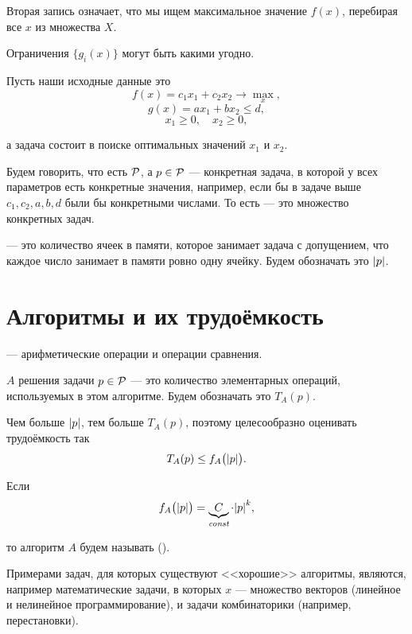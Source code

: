 Вторая запись означает, что мы ищем максимальное значение $f(x)$, перебирая все $x$ из множества $X$.

\remark

Ограничения $\{g_i(x)\}$ могут быть какими угодно.

\example

Пусть наши исходные данные это
\[f(x) = c_1 x_1 + c_2 x_2 \to \max_x,\]
\[g(x) = ax_1 + bx_2 \le d,\]
\[x_1 \ge 0, \quad x_2 \ge 0,\]

а задача состоит в поиске оптимальных значений $x_1$ и $x_2$.


Будем говорить, что есть  $\P$, а $p \in \P$ --- конкретная задача, в которой у всех параметров есть конкретные значения, например, если бы в задаче выше $c_1, c_2, a, b, d$ были бы конкретными числами. То есть  --- это множество конкретных задач.


 --- это количество ячеек в памяти, которое занимает задача с допущением, что каждое число занимает в памяти ровно одну ячейку. Будем обозначать это $\problemlength{p}$.

\section{Алгоритмы и их трудоёмкость}


 --- арифметические операции и операции сравнения.


 $A$ решения задачи $p \in \P$ --- это количество элементарных операций, используемых в этом алгоритме. Будем обозначать это $T_A(p)$.

\remark

Чем больше $\problemlength{p}$, тем больше $T_A(p)$, поэтому целесообразно оценивать трудоёмкость так
\[T_A(p) \le f_A\big(\problemlength{p}\big).\]


Если
\[
f_A\big(\problemlength{p}\big) = \underbrace{C}_{\const} \cdot \problemlength{p}^k,
\]

то алгоритм $A$ будем называть  ().

Примерами задач, для которых существуют <<хорошие>> алгоритмы, являются, например математические задачи, в которых $x$ --- множество векторов (линейное и нелинейное программирование), и задачи комбинаторики (например, перестановки).

